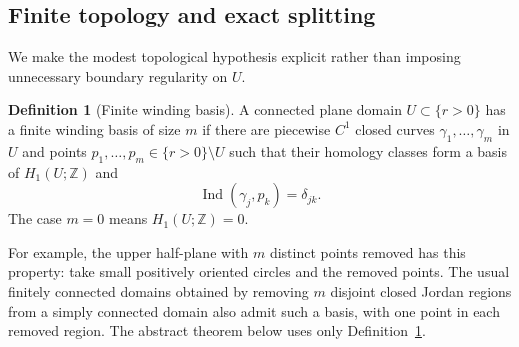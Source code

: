 \documentclass[11pt,a4paper]{article}
\numberwithin{equation}{section}
\theoremstyle{definition}
\newtheorem{definition}[theorem]{Definition}
\theoremstyle{remark}
\newcommand{\Ind}{\operatorname{Ind}}
\begin{document}
\subsection{Finite topology and exact splitting}
We make the modest topological hypothesis explicit rather than imposing
unnecessary boundary regularity on $U$.

\begin{definition}[Finite winding basis]\label{def:winding}
A connected plane domain $U\subset\{r>0\}$ has a finite winding basis
of size $m$ if there are piecewise $C^1$ closed curves
$\gamma_1,\ldots,\gamma_m$ in $U$ and points
$p_1,\ldots,p_m\in\{r>0\}\setminus U$ such that their homology classes
form a basis of $H_1(U;\mathbb Z)$ and
\begin{equation}
 \Ind(\gamma_j,p_k)=\delta_{jk}.\label{eq:winding-basis}
\end{equation}
The case $m=0$ means $H_1(U;\mathbb Z)=0$.
\end{definition}
For example, the upper half-plane with $m$ distinct points removed has
this property: take small positively oriented circles and the removed
points. The usual finitely connected domains obtained by removing $m$
disjoint closed Jordan regions from a simply connected domain also admit
such a basis, with one point in each removed region. The abstract theorem
below uses only Definition~\ref{def:winding}.
\end{document}
